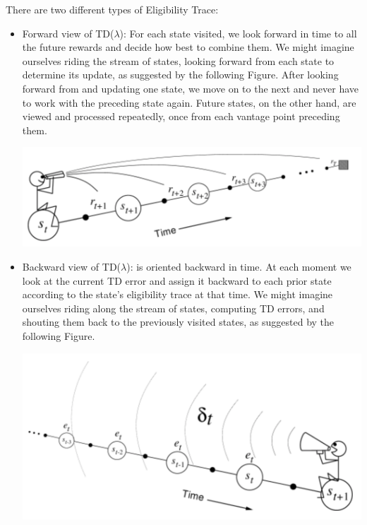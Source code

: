 \documentclass[11pt]{article}
\theoremstyle{plain}
\theoremstyle{definition}
\begin{document}
There are two different types of Eligibility Trace: 
\begin{itemize}
\item Forward view of TD($\lambda$): For each state visited, we look forward in time to all the future rewards and decide how best to combine them. We might imagine ourselves riding the stream of states, looking forward from each state to determine its update, as suggested by the following Figure. After looking forward from and updating one state, we move on to the next and never have to work with the preceding state again. Future states, on the other hand, are viewed and processed repeatedly, once from each vantage point preceding them.

\begin{center}
\includegraphics[scale=0.7]{3}
\end{center}

\item Backward view of TD($\lambda $): is oriented backward in time. At each moment we look at the current TD error and assign it backward to each prior state according to the state's eligibility trace at that time. We might imagine ourselves riding along the stream of states, computing TD errors, and shouting them back to the previously visited states, as suggested by the following Figure.

\begin{center}
\includegraphics[scale=0.7]{4}
\end{center}

\end{itemize}
\end{document}
